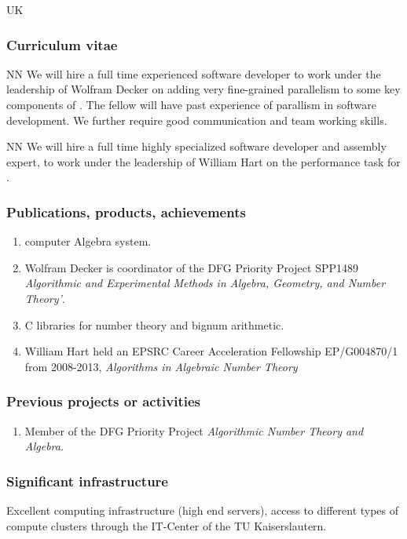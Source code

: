 \begin{sitedescription}{UK}
\subsubsection*{Curriculum vitae}




\begin{participant}[type=res,PM=48]{NN}
We will hire a full time experienced software developer to work
  under the leadership of Wolfram Decker on adding very fine-grained 
  parallelism to some key components of {}. The fellow
  will have past experience of parallism in software development.
  We further require good communication and team working
  skills.
\end{participant}

\begin{participant}[type=res,PM=12]{NN}
  We will hire a full time highly specialized software developer and
  assembly expert, to work under the leadership of William Hart on the
  performance task  for \MPIR.
\end{participant}

\subsubsection*{Publications, products, achievements}

\begin{enumerate}
\item {} computer Algebra system.
\item Wolfram Decker is coordinator of the DFG Priority Project SPP1489 \emph{Algorithmic and Experimental Methods in Algebra, Geometry, and
Number Theory'}.
\item {} C libraries for number theory and bignum arithmetic.
\item William Hart held an EPSRC Career Acceleration Fellowship EP/G004870/1 
from 2008-2013, \emph{Algorithms in Algebraic Number Theory}
\end{enumerate}

\subsubsection*{Previous projects or activities}

\begin{enumerate}
\item Member of the DFG Priority Project \emph{Algorithmic Number Theory and Algebra}.
\end{enumerate}

\subsubsection*{Significant infrastructure}

Excellent computing infrastructure (high end servers), access to 
different types of compute clusters through the IT-Center of the 
TU Kaiserslautern.
\end{sitedescription}







